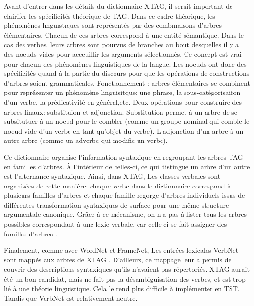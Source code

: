 Avant d'entrer dans les détails du dictionnaire XTAG, il serait important de clairifer les spécificités théorique de \ac{TAG}. Dans ce cadre théorique, les phénomènes linguistiques sont représentés par des combinaisons d'arbres élémentaires. Chacun de ces arbres correspond à une entité sémantique. Dans le cas des verbes, leurs arbres sont pourvus de branches au bout desquelles il y a des noeuds vides pour acceuillir les arguments sélectionnés. Ce concept est vrai pour chacun des phénomènes linguistiques de la langue. Les noeuds ont donc des spécificités quand à la partie du discours pour que les opérations de constructions d'arbres soient grammaticales. Fonctionnement : arbres élémentaires se combinent pour représenter un phénomène linguisitque: une phrase, la sous-catégorisaiton d'un verbe, la prédicativité en général,etc. Deux opérations pour construire des arbres finaux: substituion et adjonction. Substitution permet à un arbre de se subsitutuer à un noeud pour le combler (comme un groupe nominal qui comble le noeud vide d'un verbe en tant qu'objet du verbe). L'adjonction d'un arbre à un autre arbre (comme un adverbe qui modifie un verbe).

Ce dictionnaire organise l'information syntaxique en regroupant les arbres \ac{TAG} en familles d'arbres. À l'intérieur de celles-ci, ce qui distingue un arbre d'un autre est l'alternance syntaxique. Ainsi, dans XTAG, Les classes verbales sont organisées de cette manière: chaque verbe dans le dictionnaire correspond à plusieurs familles d'arbres et chaque famille regorge d'arbres individuels issus de différentes transformation syntaxiques de surface pour une même structure argumentale canonique. Grâce à ce mécanisme, on n'a pas à lister tous les arbres possibles correspondant à une lexie verbale, car celle-ci se fait assigner des familles d'arbres \citep{DoranXTAGSystemWide1994}.

Finalement, comme avec WordNet et FrameNet, Les entrées lexicales VerbNet sont mappés aux arbres de XTAG \citep{W04-3326}. D'ailleurs, ce mappage leur a permis de couvrir des descriptions syntaxiques qu'ils n'avaient pas répertoriés. XTAG aurait été un bon candidat, mais ne fait pas la désambiguisation des verbes, et est trop lié à une théorie linguistique. Cela le rend plus difficile à implémenter en TST. Tandis que VerbNet est relativement neutre.

